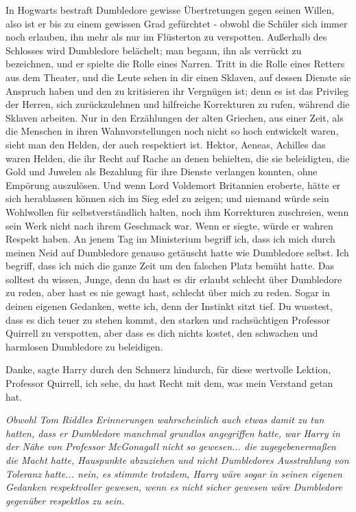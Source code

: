 \glqq{}In Hogwarts bestraft Dumbledore gewisse Übertretungen gegen seinen Willen,
also ist er bis zu einem gewissen Grad gefürchtet - obwohl die Schüler sich
immer noch erlauben, ihn mehr als nur im Flüsterton zu verspotten. Außerhalb des
Schlosses wird Dumbledore belächelt; man begann, ihn als verrückt zu bezeichnen,
und er spielte die Rolle eines Narren. Tritt in die Rolle eines Retters aus dem
Theater, und die Leute sehen in dir einen Sklaven, auf dessen Dienste sie
Anspruch haben und den zu kritisieren ihr Vergnügen ist; denn es ist das
Privileg der Herren, sich zurückzulehnen und hilfreiche Korrekturen zu rufen,
während die Sklaven arbeiten. Nur in den Erzählungen der alten Griechen, aus
einer Zeit, als die Menschen in ihren Wahnvorstellungen noch nicht so hoch
entwickelt waren, sieht man den Helden, der auch respektiert ist. Hektor,
Aeneas, Achilles das waren Helden, die ihr Recht auf Rache an denen behielten,
die sie beleidigten, die Gold und Juwelen als Bezahlung für ihre Dienste
verlangen konnten, ohne Empörung auszulösen. Und wenn Lord Voldemort Britannien
eroberte, hätte er sich herablassen können sich im Sieg edel zu zeigen; und
niemand würde sein Wohlwollen für selbstverständlich halten, noch ihm
Korrekturen zuschreien, wenn sein Werk nicht nach ihrem Geschmack war. Wenn er
siegte, würde er wahren Respekt haben. An jenem Tag im Ministerium begriff ich,
dass ich mich durch meinen Neid auf Dumbledore genauso getäuscht hatte wie
Dumbledore selbst. Ich begriff, dass ich mich die ganze Zeit um den falschen
Platz bemüht hatte. Das solltest du wissen, Junge, denn du hast es dir erlaubt
schlecht über Dumbledore zu reden, aber hast es nie gewagt hast, schlecht über
mich zu reden. Sogar in deinen eigenen Gedanken, wette ich, denn der Instinkt
sitzt tief. Du wusstest, dass es dich teuer zu stehen kommt, den starken und
rachsüchtigen Professor Quirrell zu verspotten, aber dass es dich nichts kostet,
den schwachen und harmlosen Dumbledore zu beleidigen.\grqq{}

\glqq{}Danke\grqq{}, sagte Harry durch den Schmerz hindurch, \glqq{}für diese
wertvolle Lektion, Professor Quirrell, ich sehe, du hast Recht mit dem, was mein
Verstand getan hat.\grqq{}

\emph{Obwohl Tom Riddles Erinnerungen wahrscheinlich auch etwas damit zu tun
hatten, dass er Dumbledore manchmal grundlos angegriffen hatte, war Harry in der
Nähe von Professor McGonagall nicht so gewesen... die zugegebenermaßen die Macht
hatte, Hauspunkte abzuziehen und nicht Dumbledores Ausstrahlung von Toleranz
hatte... nein, es stimmte trotzdem, Harry wäre sogar in seinen eigenen Gedanken
respektvoller gewesen, wenn es nicht sicher gewesen wäre Dumbledore gegenüber
respektlos zu sein.}

